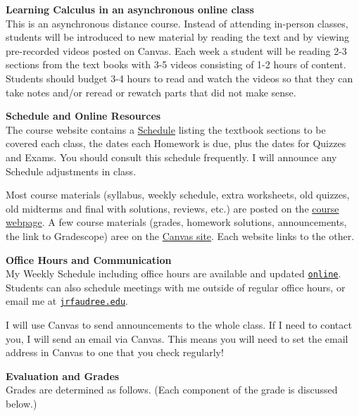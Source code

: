 \documentclass[12pt]{article}
\renewcommand{\emph}[1]{\textsf{\textbf{#1}}}
\newcommand{\localhead}[1]{\par\smallskip\textbf{#1} \smallskip\nobreak\\}%
\def\heading#1{\localhead{\large\emph{#1}}}
\begin{document}
\heading{Learning Calculus in an asynchronous online class}
This is an asynchronous distance course. Instead of attending in-person classes, students will be introduced to new material by reading the text and by viewing pre-recorded videos posted on Canvas. Each week a student  will be reading 2-3 sections from the text books with 3-5 videos consisting of 1-2 hours of content. Students should budget 3-4 hours to read and watch the
videos so that they can take notes and/or reread or rewatch parts that did not make sense.

\heading{Schedule and Online Resources}
The course website contains a \href{https://docs.google.com/spreadsheets/d/e/2PACX-1vSetyTdOP14yatuWNH7CuB9yCT3zqOhFWYmCj1BzRAZhU4eHCXCJaRjnCgxgZW_NieE59iLRok3NdzK/pubhtml?gid=0&single=true}{Schedule} listing the textbook sections to be covered each class, the dates each Homework is due, plus the dates for Quizzes and Exams. You should consult this schedule frequently.  I will announce any Schedule adjustments in class.

Most course materials (syllabus, weekly schedule, extra worksheets, old quizzes, old midterms and final with solutions, reviews, etc.) are posted on the \href{https://uaf-math251.github.io/calc2/}{course webpage}.  A few course materials (grades, homework solutions, announcements, the link to Gradescope) aree on the \href{https://canvas.alaska.edu/courses/18799}{Canvas site}.  Each website links to the other.


\heading{Office Hours and Communication}
My Weekly Schedule including office hours are available and updated \href{https://docs.google.com/spreadsheets/d/e/2PACX-1vSPkx0I1WQikJjmR8qs8wpf2oWcwO8CFS2VwCZYsdusMDkxTIQuOVwcV8LfAtsDtUGoj49xCS1mOIrW/pubhtml}{\texttt{online}}.  Students can also schedule meetings with me outside of regular office hours, or email me at \href{mailto:jrfaudree@alaska.edu}{\texttt{jrfaudree\@@alaska.edu}}.

I will use Canvas to send announcements to the whole class. If I need to contact you, I will send an email via Canvas.  This means you will need to set the email address in Canvas to one that you check regularly!


\heading{Evaluation and Grades}
Grades are determined as follows.  (Each component of the grade is discussed below.)
 
\end{document}
